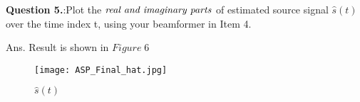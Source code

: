 \documentclass[11pt]{article}
\begin{document}
\begin{mdframed}[backgroundcolor=lightshadecolor, linewidth=0pt, innertopmargin=12pt, innerbottommargin=12pt]
    {\bf Question 5.}:Plot the $\emph{real and imaginary parts}$ of estimated source signal $\hat{s}(t)$ over the time index t, using your beamformer in Item 4.
\end{mdframed}
Ans.\newline
Result is shown in $Figure\;6$\newline
\begin{figure}[h]
    \centering
    \texttt{[image: ASP\_Final\_hat.jpg]} 
    \caption{$\hat{s}(t)$}
\end{figure}
%
%
\end{document}
